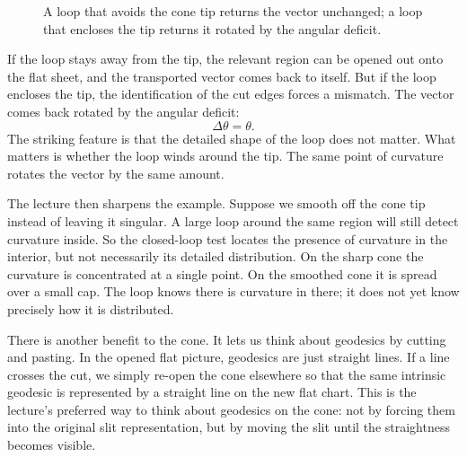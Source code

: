 \begin{figure}[h]
\centering
{}%
\caption{A loop that avoids the cone tip returns the vector unchanged; a loop that encloses the tip returns it rotated by the angular deficit.}
\end{figure}

If the loop stays away from the tip, the relevant region can be opened out onto the flat sheet, and the transported vector comes back to itself. But if the loop encloses the tip, the identification of the cut edges forces a mismatch. The vector comes back rotated by the angular deficit:
\begin{equation}
\Delta\theta=\theta.
\end{equation}
The striking feature is that the detailed shape of the loop does not matter. What matters is whether the loop winds around the tip. The same point of curvature rotates the vector by the same amount.

The lecture then sharpens the example. Suppose we smooth off the cone tip instead of leaving it singular. A large loop around the same region will still detect curvature inside. So the closed-loop test locates the presence of curvature in the interior, but not necessarily its detailed distribution. On the sharp cone the curvature is concentrated at a single point. On the smoothed cone it is spread over a small cap. The loop knows there is curvature in there; it does not yet know precisely how it is distributed.

There is another benefit to the cone. It lets us think about geodesics by cutting and pasting. In the opened flat picture, geodesics are just straight lines. If a line crosses the cut, we simply re-open the cone elsewhere so that the same intrinsic geodesic is represented by a straight line on the new flat chart. This is the lecture's preferred way to think about geodesics on the cone: not by forcing them into the original slit representation, but by moving the slit until the straightness becomes visible.

